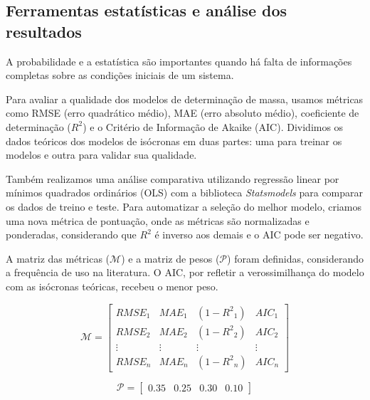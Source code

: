    
    \subsection{Ferramentas estatísticas e análise dos resultados}\label{sec:estatistica}
    A probabilidade e a estatística são importantes quando há falta de informações completas sobre as condições iniciais de um sistema.
    
    Para avaliar a qualidade dos modelos de determinação de massa, usamos métricas como RMSE (erro quadrático médio), MAE (erro absoluto médio), coeficiente de determinação (\(R^2\)) e o Critério de Informação de Akaike (AIC). Dividimos os dados teóricos dos modelos de isócronas em duas partes: uma para treinar os modelos e outra para validar sua qualidade.
    
    Também realizamos uma análise comparativa utilizando regressão linear por mínimos quadrados ordinários (OLS) com a biblioteca \textit{Statsmodels} para comparar os dados de treino e teste. Para automatizar a seleção do melhor modelo, criamos uma nova métrica de pontuação, onde as métricas são normalizadas e ponderadas, considerando que \(R^2\) é inverso aos demais e o AIC pode ser negativo.
    
    A matriz das métricas (\(\mathcal{M}\)) e a matriz de pesos (\(\mathcal{P}\)) foram definidas, considerando a frequência de uso na literatura. O AIC, por refletir a verossimilhança do modelo com as isócronas teóricas, recebeu o menor peso.
    
    \begin{equation}
    	\label{matrix:metric}
    	\mathcal{M}=\begin{bmatrix}
    		{RMSE}_{1} & {MAE}_{1} & (1 - {R^2}_{1}) & {AIC}_{1} \\
    		{RMSE}_{2} & {MAE}_{2} & (1 - {R^2}_{2}) & {AIC}_{2} \\
    		\vdots & \vdots & \vdots & \vdots \\
    		{RMSE}_{n} & {MAE}_{n} & (1 - {R^2}_{n}) & {AIC}_{n}
    	\end{bmatrix}
    \end{equation}
    
    \begin{equation}
    	\label{matrix:pesos}
    	\mathcal{P}=\begin{bmatrix}
    		0.35 & 0.25 & 0.30 & 0.10  
    	\end{bmatrix}
    \end{equation}
    
